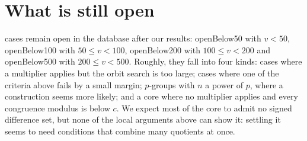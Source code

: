 \section{What is still open}\label{sec:open}

\stillOpen{} cases remain open in the database after our results:
\csname openBelow50\endcsname{} with $v < 50$, \csname openBelow100\endcsname{} with
$50 \le v < 100$, \csname openBelow200\endcsname{} with $100 \le v < 200$ and
\csname openBelow500\endcsname{} with $200 \le v < 500$. Roughly, they fall into four kinds:
cases where a multiplier applies but the orbit search is too large; cases where one of the
criteria above fails by a small margin; $p$-groups with $n$ a power of $p$, where a construction
seems more likely; and a core where no multiplier applies and every congruence modulus is below
$c$. We expect most of the core to admit no signed difference set, but none of the local
arguments above can show it: settling it seems to need conditions that combine many quotients
at once.
